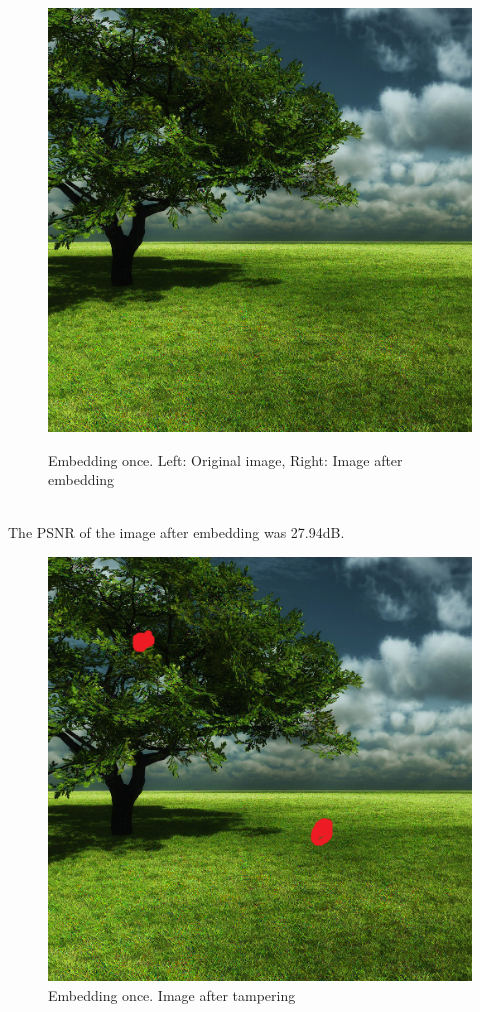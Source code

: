 \documentclass[12pt]{article}
\begin{document}
\begin{figure}[h]
{\includegraphics[scale=0.45]{"Tree Embed once 0.8 threshold/finalImage"}%
}%
\caption{Embedding once. Left: Original image, Right: Image after embedding}
\label{fig:treeEmbedOnceEmbedding}
\end{figure}

\hspace{0pt} \\
The PSNR of the image after embedding was 27.94dB.

\begin{figure}[h]
\centerline{%
\includegraphics[scale=0.45]{"Tree Embed once 0.8 threshold/finalImage - Copy"}%
}%
\caption{Embedding once. Image after tampering}
\label{fig:treeEmbedOnceTamper}
\end{figure}
\end{document}
